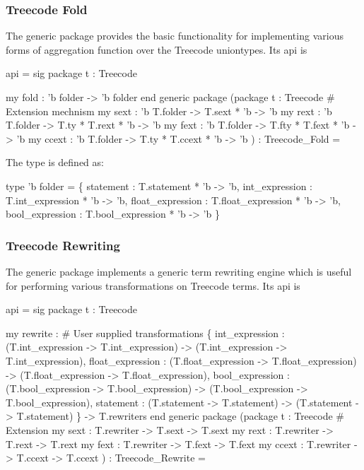 \subsubsection{Treecode Fold}
The generic package 
provides the basic functionality for implementing various forms of
aggregation function over the Treecode uniontypes.  Its api is
\begin{SML}
api  =
sig
   package t : Treecode

   my fold : 'b folder -> 'b folder
end
generic package 
  (package t : Treecode
   #  Extension mechnism 
   my sext  : 'b T.folder -> T.sext * 'b -> 'b
   my rext  : 'b T.folder -> T.ty * T.rext * 'b -> 'b
   my fext  : 'b T.folder -> T.fty * T.fext * 'b -> 'b
   my ccext : 'b T.folder -> T.ty * T.ccext * 'b -> 'b
  ) : Treecode_Fold =
\end{SML}
The type  is defined as:
\begin{SML}
   type 'b folder =
       \{ statement   : T.statement * 'b -> 'b,
         int_expression  : T.int_expression * 'b -> 'b,
         float_expression  : T.float_expression * 'b -> 'b, 
         bool_expression : T.bool_expression * 'b -> 'b
       \}
\end{SML}


\subsubsection{Treecode Rewriting}

The generic package 
implements a generic term rewriting engine which is useful for performing
various transformations on Treecode terms. Its api is
\begin{SML}
api  =
sig
   package t : Treecode

  my rewrite : 
       #  User supplied transformations 
       \{ int_expression  : (T.int_expression -> T.int_expression) -> (T.int_expression -> T.int_expression), 
         float_expression  : (T.float_expression -> T.float_expression) -> (T.float_expression -> T.float_expression),
         bool_expression : (T.bool_expression -> T.bool_expression) -> (T.bool_expression -> T.bool_expression),
         statement   : (T.statement -> T.statement) -> (T.statement -> T.statement)
       \} -> T.rewriters
end
generic package 
  (package t : Treecode
   #  Extension 
   my sext : T.rewriter -> T.sext -> T.sext
   my rext : T.rewriter -> T.rext -> T.rext
   my fext : T.rewriter -> T.fext -> T.fext
   my ccext : T.rewriter -> T.ccext -> T.ccext
  ) : Treecode_Rewrite =
\end{SML}

